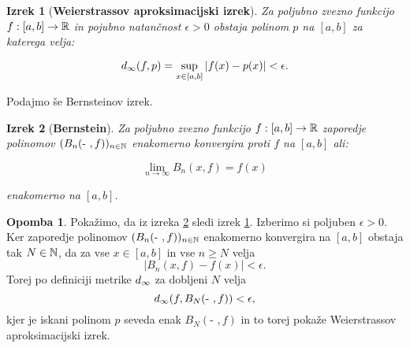 \documentclass[a4paper, reqno]{amsart}
\theoremstyle{theorem}
\newtheorem{izrek}{Izrek}[section]
\theoremstyle{definition}
\newtheorem*{opomba*}{Opomba}
\begin{document}
\begin{izrek}[\textbf{Weierstrassov aproksimacijski izrek}]
	\label{Weierstrass}
	Za poljubno zvezno funkcijo $f: [a, b] \to \mathbb{R}$ in pojubno natančnost $\epsilon > 0$
	obstaja polinom $p$ na $[a,b]$ za katerega velja:

	$$ d_{\infty}(f, p) = \sup_{x \in [a, b]} |f(x)-p(x)| < \epsilon\text{.}$$
	
\end{izrek}
	
Podajmo še Bernsteinov izrek.

\begin{izrek}[\textbf{Bernstein}]
	\label{Bernsteinov izrek}
	Za poljubno zvezno funkcijo $f:[a, b] \to \mathbb{R}$ zaporedje polinomov 
	$(B_n(\text{- },f))_{n \in \mathbb{N}}$ enakomerno konvergira
	proti $f$ na $[a, b]$ ali:

	$$ \lim_{n\to\infty}B_n(x, f) = f(x)$$

	enakomerno na $[a,b]$.
\end{izrek}

\begin{opomba*}
	Pokažimo, da iz izreka \ref{Bernsteinov izrek} sledi izrek \ref{Weierstrass}.
	Izberimo si poljuben $\epsilon > 0$. Ker zaporedje polinomov 
	$(B_n(\text{- },f))_{n \in \mathbb{N}}$ enakomerno konvergira na $[a,b]$ obstaja tak 
	$N \in \mathbb{N}$, da za vse $x \in [a,b]$ in vse $n \geq N$ velja
	$$ |B_n(x,f) - f(x)| < \epsilon\text{.}$$
	Torej po definiciji metrike $d_{\infty}$ za dobljeni $N$ velja
	\begin{equation*}
		d_{\infty}(f, B_N(\text{- },f)) < \epsilon \text{,}
	\end{equation*}
	kjer je iskani polinom $p$ seveda enak $B_N(\text{- },f)$ in to torej pokaže 
	Weierstrassov aproksimacijski izrek.
\end{opomba*}
\end{document}
